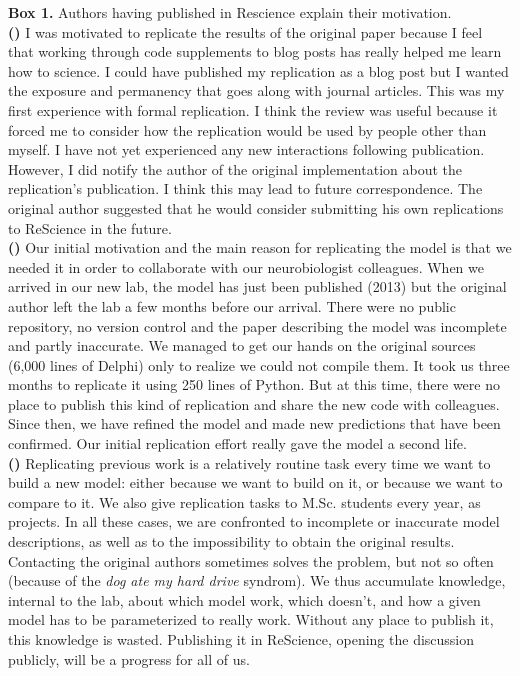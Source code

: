 \documentclass[a4paper,10pt, twocolumn]{article}
\begin{document}
\begin{tcolorbox}[breakable, pad at break*=1mm,
                  colback=black!2.5, arc=0pt, outer arc=0pt, boxrule=0pt]
\begin{footnotesize}
\textbf{Box 1.} Authors having  published in Rescience explain their motivation.\\

\textbf{(\cite{stachelek:2016})} I was motivated to replicate the results of
the original paper because I feel that working through code supplements to blog
posts has really helped me learn how to science. I could have published my
replication as a blog post but I wanted the exposure and permanency that goes
along with journal articles. This was my first experience with formal
replication. I think the review was useful because it forced me to consider how
the replication would be used by people other than myself. I have not yet
experienced any new interactions following publication. However, I did notify
the author of the original implementation about the replication's
publication. I think this may lead to future correspondence. The original
author suggested that he would consider submitting his own replications to
ReScience in the future.\\

\textbf{(\cite{topalidou:2015b})} Our initial motivation and the main reason
for replicating the model is that we needed it in order to collaborate with our
neurobiologist colleagues. When we arrived in our new lab, the model has just
been published (2013) but the original author left the lab a few months before
our arrival. There were no public repository, no version control and the paper
describing the model was incomplete and partly inaccurate. We managed to get
our hands on the original sources (6,000 lines of Delphi) only to realize we
could not compile them. It took us three months to replicate it using 250 lines
of Python. But at this time, there were no place to publish this kind of
replication and share the new code with colleagues. Since then, we have refined
the model and made new predictions that have been confirmed. Our initial
replication effort really gave the model a second life.\\

\textbf{(\cite{viejo:2016})} Replicating previous work is a relatively routine
task every time we want to build a new model: either because we want to build
on it, or because we want to compare to it. We also give replication tasks to
M.Sc. students every year, as projects. In all these cases, we are confronted
to incomplete or inaccurate model descriptions, as well as to the impossibility
to obtain the original results. Contacting the original authors sometimes
solves the problem, but not so often (because of the {\em dog ate my hard
  drive} syndrom). We thus accumulate knowledge, internal to the lab, about
which model work, which doesn't, and how a given model has to be parameterized
to really work. Without any place to publish it, this knowledge is
wasted. Publishing it in ReScience, opening the discussion publicly, will be a
progress for all of us. \par
\end{footnotesize}
\end{tcolorbox}
\end{document}
